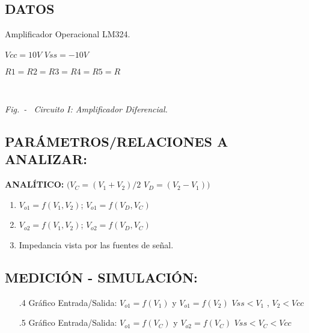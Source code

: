 \subsection{DATOS}
Amplificador Operacional LM324.

$Vcc = 10V$  $Vss = -10V$

$R1 = R2 = R3 = R4 = R5 = R$

\begin{center}
	 \\
	\begin{center}
    	\begin{small}
        \textit{Fig.\thefigure \ - \ 	Circuito I: Amplificador Diferencial.}
		\end{small}
    \end{center}
\end{center}

\subsection{PARÁMETROS/RELACIONES A ANALIZAR:}

\noindent \textbf{ANALÍTICO:} $(V_{C}= ( V_{1} + V_{2} )/2$ \space $V_{D} =( V_{2} - V_{1} ) )$
\begin{enumerate}[\one .1]
    \item $V_{o1} = f(V_{1}, V_{2} )$; $V_{o1} = f(V_{D} ,V_{C} )$
    \item $V_{o2} = f(V_{1}, V_{2} )$; $V_{o2} = f(V_{D} ,V_{C} )$
    \item Impedancia vista por las fuentes de señal.
\end{enumerate}

\subsection{MEDICIÓN - SIMULACIÓN:}
\begin{enumerate}[\one.4]
    \item[\one.4] {Gráfico Entrada/Salida: $V_{o1}=f(V_{1})$\hspace{0.25cm} y \hspace{0.25cm} $V_{o1} = f(V_{2})$ \hspace{0.25cm}$Vss < V_{1}$\hspace{0.25cm} , $V_{2} < Vcc$}
    
    \item[\one.5] {Gráfico Entrada/Salida: $V_{o1}=f(V_{C} )$\hspace{0.25cm} y \hspace{0.25cm}$V_{o2} = f(V_{C} )$\hspace{0.25cm} $Vss<V_{C}< Vcc$}
\end{enumerate}
